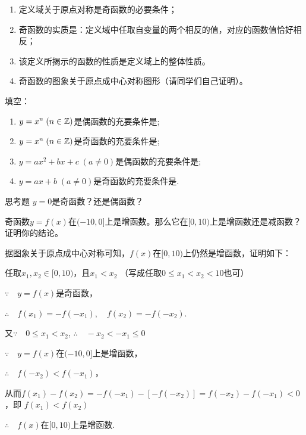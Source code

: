 \begin{note}
\begin{enumerate}
    \item 定义域关于原点对称是奇函数的必要条件；
    \item 奇函数的实质是：定义域中任取自变量的两个相反的值，对应的函数值恰好相反；
    \item 该定义所揭示的函数的性质是定义域上的整体性质。
    \item 奇函数的图象关于原点成中心对称图形（请同学们自己证明）。
\end{enumerate}
\end{note}

\begin{ex}
填空：
\begin{enumerate}[(1)]
    \item $y=x^n\; (n\in\mathbb{Z})$是偶函数的充要条件是\blank;
    \item $y=x^n\; (n\in\mathbb{Z})$是奇函数的充要条件是\blank;
    \item $y=ax^2+bx+c\; (a\ne 0)$是偶函数的充要条件是\blank;
    \item $y=ax+b\; (a\ne 0)$是奇函数的充要条件是\blank.
\end{enumerate}
\end{ex}

\begin{thm}{思考题}
    $y=0$是奇函数？还是偶函数？    
\end{thm}

\begin{example}
    奇函数$y=f(x)$在$(-10,0]$上是增函数。那么它在$[0,10)$上是增函数还是减函数？证明你的结论。
\end{example}

\begin{solution}
据图象关于原点成中心对称可知，$f(x)$在$[0,10)$上仍然是增函数，证明如下：

任取$x_1,x_2\in [0,10)$，且$x_1<x_2$ （写成任取$0\le x_1<x_2<10$也可）

$\because\quad y=f(x)$是奇函数，

$\therefore\quad f(x_1)=-f(-x_1),\quad f(x_2)=-f(-x_2)$.

又$\because\quad 0\le x_1<x_2$, $\therefore\quad -x_2<-x_1\le 0$

$\because\quad y=f(x)$在$(-10,0]$上是增函数，

$\therefore\quad f(-x_2)<f(-x_1)$，

从而$f(x_1)-f(x_2)=-f(-x_1)-[-f(-x_2)]=f(-x_2)-f(-x_1)<0$，即
$f(x_1)<f(x_2)$

$\therefore\quad f(x)$在$[0,10)$上是增函数.
\end{solution}

